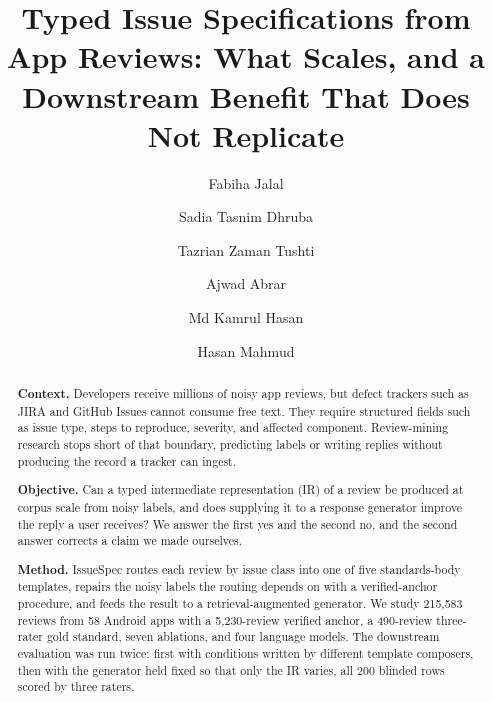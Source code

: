 \documentclass[preprint,12pt]{elsarticle}
\begin{document}
\begin{frontmatter}

\title{Typed Issue Specifications from App Reviews: What Scales, and a Downstream Benefit That Does Not Replicate}

\author[inst1]{Fabiha Jalal}
\author[inst1]{Sadia Tasnim Dhruba}
\author[inst1]{Tazrian Zaman Tushti}
\author[inst2]{Ajwad Abrar}
\author[inst2]{Md Kamrul Hasan}
\author[inst2]{Hasan Mahmud}



\begin{abstract}
\textbf{Context.} Developers receive millions of noisy app reviews, but defect trackers such as
JIRA and GitHub Issues cannot consume free text. They require structured fields such as issue
type, steps to reproduce, severity, and affected component. Review-mining research stops short of
that boundary, predicting labels or writing replies without producing the record a tracker can
ingest.

\textbf{Objective.} Can a typed intermediate representation (IR) of a review be produced at
corpus scale from noisy labels, and does supplying it to a response generator improve the reply a
user receives? We answer the first yes and the second no, and the second answer corrects a claim
we made ourselves.

\textbf{Method.} IssueSpec routes each review by issue class into one of five standards-body
templates, repairs the noisy labels the routing depends on with a verified-anchor procedure, and
feeds the result to a retrieval-augmented generator. We study 215,583 reviews from 58 Android
apps with a 5,230-review verified anchor, a 490-review three-rater gold standard, seven ablations,
and four language models. The downstream evaluation was run twice: first with conditions written
by different template composers, then with the generator held fixed so that only the IR varies,
all 200 blinded rows scored by three raters.


\end{abstract}
\end{frontmatter}
\end{document}
